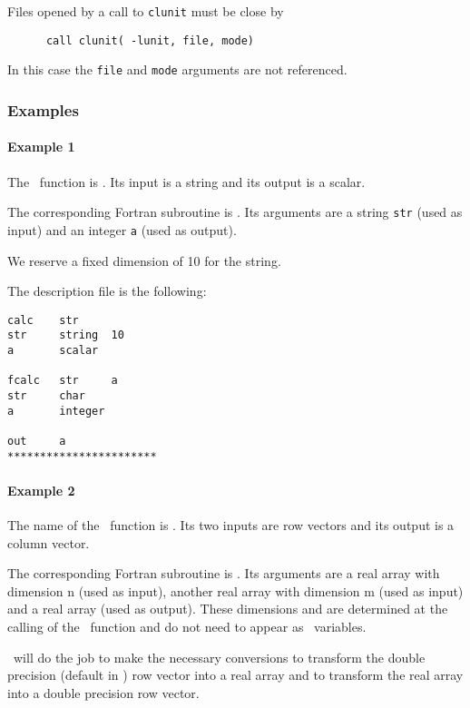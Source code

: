 Files opened by a call to {\tt   clunit} must be close by 
\begin{verbatim}
      call clunit( -lunit, file, mode)
\end{verbatim}
In this case the {\tt file} and  {\tt mode} arguments are not
referenced.

\subsubsection{Examples}

\paragraph{Example 1}
\label{ex1}

The \SCI\ function is . Its input is a string and its
output is a scalar.

The corresponding Fortran subroutine is . Its arguments
are a string {\tt str} (used as input) and an integer {\tt a} (used as output).

We reserve a fixed dimension of 10 for the string.

The description file is the following:
\begin{verbatim}
calc    str
str     string  10
a       scalar

fcalc   str     a
str     char
a       integer

out     a
***********************
\end{verbatim}

\paragraph{Example 2}
\label{ex2}

The name of the \SCI\ function is . Its two inputs are
row vectors and its  output is a column vector.

The corresponding Fortran subroutine is . Its arguments
are a real array with dimension n (used as input), another 
real array with  dimension m (used as input) and a real array (used as output).
These dimensions  and  are determined at the calling of the \SCI\
function and do not need to appear as \SCI\ variables.

\ISCI\ will do the job to make the necessary conversions to transform the
double precision (default in \SCI) row vector \T{a} into a real array and to
transform the real array \T{c} into a double precision row vector.

